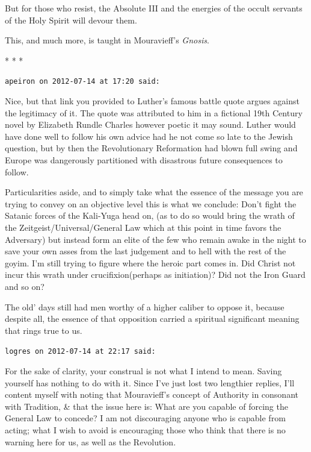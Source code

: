 But for those who resist, the Absolute III and the energies of the occult servants of the Holy Spirit will devour them.

This, and much more, is taught in Mouravieff's \emph{Gnosis}.



\begin{center}* * *\end{center}

\begin{footnotesize}
\begin{sffamily}
\texttt{apeiron on 2012-07-14 at 17:20 said:}

Nice, but that link you provided to Luther's famous battle quote argues against the legitimacy of it. The quote was attributed to him in a fictional 19th Century novel by Elizabeth Rundle Charles however poetic it may sound. Luther would have done well to follow his own advice had he not come so late to the Jewish question, but by then the Revolutionary Reformation had blown full swing and Europe was dangerously partitioned with disastrous future consequences to follow.

Particularities aside, and to simply take what the essence of the message you are trying to convey on an objective level this is what we conclude: Don't fight the Satanic forces of the Kali-Yuga head on, (as to do so would bring the wrath of the Zeitgeist/Universal/General Law which at this point in time favors the Adversary) but instead form an elite of the few who remain awake in the night to save your own asses from the last judgement and to hell with the rest of the goyim. I'm still trying to figure where the heroic part comes in. Did Christ not incur this wrath under crucifixion(perhaps as initiation)? Did not the Iron Guard and so on?

The old' days still had men worthy of a higher caliber to oppose it, because despite all, the essence of that opposition carried a spiritual significant meaning that rings true to us.

\hfill

\texttt{logres on 2012-07-14 at 22:17 said:}

For the sake of clarity, your construal is not what I intend to mean. Saving yourself has nothing to do with it. Since I've just lost two lengthier replies, I'll content myself with noting that Mouravieff's concept of Authority in consonant with Tradition, \& that the issue here is: What are you capable of forcing the General Law to concede? I am not discouraging anyone who is capable from acting; what I wish to avoid is encouraging those who think that there is no warning here for us, as well as the Revolution.


\end{sffamily}
\end{footnotesize}
